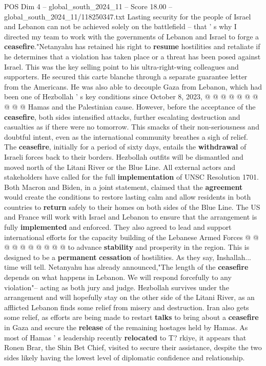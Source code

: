 \begin{textsample}{POS Dim 4 – global\_south\_2024\_11 – Score 18.00 – global\_south\_2024\_11/118250347.txt}
Lasting security for the people of Israel and Lebanon can not be achieved solely on the battlefield -- that ' s why I directed my team to work with the governments of Lebanon and Israel to forge a \textbf{ceasefire}."Netanyahu has retained his right to \textbf{resume} hostilities and retaliate if he determines that a violation has taken place or a threat has been posed against Israel.
This was the key selling point to his ultra-right-wing colleagues and supporters.
He secured this carte blanche through a separate guarantee letter from the Americans.
He was also able to decouple Gaza from Lebanon, which had been one of Hezbollah ' s key conditions since October 8, 2023, @ @ @ @ @ @ @ @ @ @ Hamas and the Palestinian cause.
However, before the acceptance of the \textbf{ceasefire}, both sides intensified attacks, further escalating destruction and casualties as if there were no tomorrow.
This smacks of their non-seriousness and doubtful intent, even as the international community breathes a sigh of relief.
The \textbf{ceasefire}, initially for a period of sixty days, entails the \textbf{withdrawal} of Israeli forces back to their borders.
Hezbollah outfits will be dismantled and moved north of the Litani River or the Blue Line.
All external actors and stakeholders have called for the full \textbf{implementation} of UNSC Resolution 1701.
Both Macron and Biden, in a joint statement, claimed that the \textbf{agreement} would create the conditions to restore lasting calm and allow residents in both countries to \textbf{return} safely to their homes on both sides of the Blue Line.
The US and France will work with Israel and Lebanon to ensure that the arrangement is fully \textbf{implemented} and enforced.
They also agreed to lead and support international efforts for the capacity building of the Lebanese Armed Forces @ @ @ @ @ @ @ @ @ @ to advance \textbf{stability} and prosperity in the region.
This is designed to be a \textbf{permanent} \textbf{cessation} of hostilities.
As they say, Inshallah... time will tell.
Netanyahu has already announced,"The length of the \textbf{ceasefire} depends on what happens in Lebanon.
We will respond forcefully to any violation"-- acting as both jury and judge.
Hezbollah survives under the arrangement and will hopefully stay on the other side of the Litani River, as an afflicted Lebanon finds some relief from misery and destruction.
Iran also gets some relief, as efforts are being made to restart \textbf{talks} to bring about a \textbf{ceasefire} in Gaza and secure the \textbf{release} of the remaining hostages held by Hamas.
As most of Hamas ' s leadership recently \textbf{relocated} to T? rkiye, it appears that Ronen Brar, the Shin Bet Chief, visited to secure their assistance, despite the two sides likely having the lowest level of diplomatic confidence and relationship.

\end{textsample}
